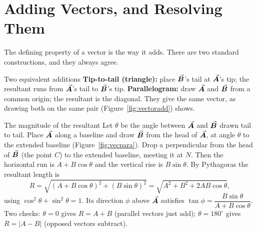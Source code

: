 \section{Adding Vectors, and Resolving Them}\label{sec:vecadd}

The defining property of a vector is the way it adds. There are two standard constructions, and they always
agree.

\begin{keybox}{Two equivalent additions}
\textbf{Tip-to-tail (triangle):} place $\vec{\bm{B}}$'s tail at $\vec{\bm{A}}$'s tip; the resultant runs from $\vec{\bm{A}}$'s tail to
$\vec{\bm{B}}$'s tip. \textbf{Parallelogram:} draw $\vec{\bm{A}}$ and $\vec{\bm{B}}$ from a common origin; the resultant is the
diagonal. They give the same vector, as drawing both on the same pair (Figure~\ref{fig:vectoradd}) shows.
\end{keybox}

\begin{figure}[htbp]
\centering
{}
\end{figure}

\begin{figure}[htbp]
\centering
{}
\end{figure}

\begin{derivbox}{The magnitude of the resultant}
Let $\theta$ be the angle between $\vec{\bm{A}}$ and $\vec{\bm{B}}$ drawn tail to tail. Place $\vec{\bm{A}}$ along a
baseline and draw $\vec{\bm{B}}$ from the head of $\vec{\bm{A}}$, at angle $\theta$ to the extended baseline
(Figure~\ref{fig:vecpara}). Drop a perpendicular from the head of $\vec{\bm{B}}$
(the point $C$) to the extended baseline, meeting it at $N$. Then the horizontal run is $A+B\cos\theta$ and the vertical
rise is $B\sin\theta$. By Pythagoras the resultant length is
\[
R=\sqrt{(A+B\cos\theta)^2+(B\sin\theta)^2}=\sqrt{A^2+B^2+2AB\cos\theta},
\]
using $\cos^2\theta+\sin^2\theta=1$. Its direction $\phi$ above $\vec{\bm{A}}$ satisfies
$\tan\phi=\dfrac{B\sin\theta}{A+B\cos\theta}$. Two checks: $\theta=0$ gives $R=A+B$ (parallel vectors
just add); $\theta=180^\circ$ gives $R=|A-B|$ (opposed vectors subtract).
\end{derivbox}

